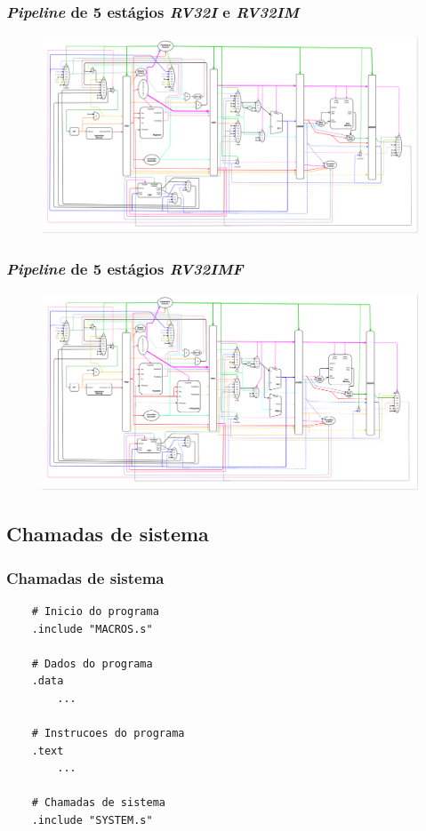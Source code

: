 \documentclass[aspectratio=169]{beamer}
\begin{document}
    \begin{frame}
        \frametitle{\textit{Pipeline} de 5 estágios \textit{RV32I} e \textit{RV32IM}}
        \vfill
        \begin{figure}[H]
        \centering
            \includegraphics[width=.99\textwidth,height=.85\textheight,keepaspectratio]{../images/uarch_diagrams/pipeline-RV32I-RV32IM.png}
        \end{figure}
        \vfill
    \end{frame}

    \begin{frame}
        \frametitle{\textit{Pipeline} de 5 estágios \textit{RV32IMF}}
        \vfill
        \begin{figure}[H]
        \centering
            \includegraphics[width=.99\textwidth,height=.85\textheight,keepaspectratio]{../images/uarch_diagrams/pipeline-RV32IMF.png}
        \end{figure}
        \vfill
    \end{frame}

    \subsection{Chamadas de sistema}
    \begin{frame}[fragile]
        \frametitle{Chamadas de sistema}
        \vfill
        \begin{lstlisting}
    # Inicio do programa
    .include "MACROS.s"

    # Dados do programa
    .data
        ...

    # Instrucoes do programa
    .text
        ...

    # Chamadas de sistema
    .include "SYSTEM.s"
        \end{lstlisting}
        \vfill
    \end{frame}
\end{document}

